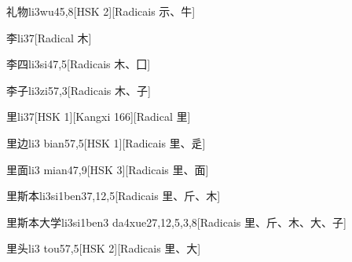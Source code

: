 \begin{entry}{礼物}{li3wu4}{5,8}[HSK 2][Radicais ⽰、⽜]
\end{entry}

\begin{entry}{李}{li3}{7}[Radical ⽊]
\end{entry}

\begin{entry}{李四}{li3si4}{7,5}[Radicais ⽊、⼞]
\end{entry}

\begin{entry}{李子}{li3zi5}{7,3}[Radicais ⽊、⼦]
\end{entry}

\begin{entry}{里}{li3}{7}[HSK 1][Kangxi 166][Radical ⾥]
\end{entry}

\begin{entry}{里边}{li3 bian5}{7,5}[HSK 1][Radicais ⾥、⾡]
\end{entry}

\begin{entry}{里面}{li3 mian4}{7,9}[HSK 3][Radicais ⾥、⾯]
\end{entry}

\begin{entry}{里斯本}{li3si1ben3}{7,12,5}[Radicais ⾥、⽄、⽊]
\end{entry}

\begin{entry}{里斯本大学}{li3si1ben3 da4xue2}{7,12,5,3,8}[Radicais ⾥、⽄、⽊、⼤、⼦]
\end{entry}

\begin{entry}{里头}{li3 tou5}{7,5}[HSK 2][Radicais ⾥、⼤]
\end{entry}

